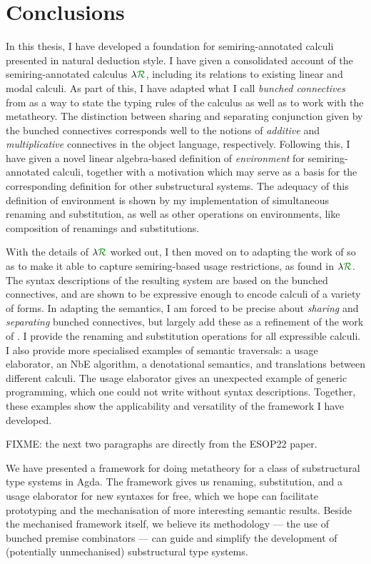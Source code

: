 \chapter{Conclusions}\label{sec:conc}

In this thesis, I have developed a foundation for semiring-annotated calculi
presented in natural deduction style.
I have given a consolidated account of the semiring-annotated calculus $\name$,
including its relations to existing linear and modal calculi.
As part of this, I have adapted what I call \emph{bunched connectives} from
\cite{RPKV20} as a way to state the typing rules of the calculus as well as to
work with the metatheory.
The distinction between sharing and separating conjunction given by the bunched
connectives corresponds well to the notions of \emph{additive} and
\emph{multiplicative} connectives in the object language, respectively.
Following this, I have given a novel linear algebra-based definition of
\emph{environment} for semiring-annotated calculi, together with a motivation
which may serve as a basis for the corresponding definition for other
substructural systems.
The adequacy of this definition of environment is shown by my implementation of
simultaneous renaming and substitution, as well as other operations on
environments, like composition of renamings and substitutions.

With the details of $\name$ worked out, I then moved on to adapting the work of
\citet{AACMM21} so as to make it able to capture semiring-based usage
restrictions, as found in $\name$.
The syntax descriptions of the resulting system are based on the bunched
connectives, and are shown to be expressive enough to encode calculi of a
variety of forms.
In adapting the semantics, I am forced to be precise about \emph{sharing} and
\emph{separating} bunched connectives, but largely add these as a refinement of
the work of \citet{AACMM21}.
I provide the renaming and substitution operations for all expressible calculi.
I also provide more specialised examples of semantic traversals:
a usage elaborator, an NbE algorithm, a denotational semantics, and translations
between different calculi.
The usage elaborator gives an unexpected example of generic programming, which
one could not write without syntax descriptions.
Together, these examples show the applicability and versatility of the framework
I have developed.

FIXME: the next two paragraphs are directly from the ESOP22 paper.

We have presented a framework for doing metatheory for a class of substructural
type systems in Agda.
The framework gives us renaming, substitution, and a usage elaborator for new
syntaxes for free, which we hope can facilitate prototyping and the
mechanisation of more interesting semantic results.
Beside the mechanised framework itself, we believe its methodology --- the use
of bunched premise combinators --- can guide and simplify the development of
(potentially unmechanised) substructural type systems.

